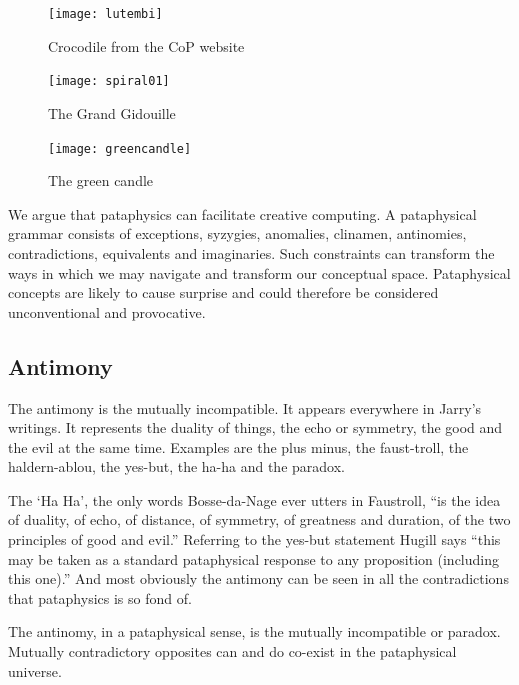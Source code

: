 \begin{figure}[htb]
  \centering
  \begin{minipage}{.275\linewidth}
    \texttt{[image: lutembi]}
  \caption[Crocodile]{Crocodile from the CoP website}
\label{img1}
  \end{minipage}
  \hspace{.05\linewidth}
  \begin{minipage}{.275\linewidth}
    \texttt{[image: spiral01]}
  \caption[Gidouille]{The Grand Gidouille}
\label{img2}
  \end{minipage}
  \hspace{.05\linewidth}
  \begin{minipage}{.275\linewidth}
    \texttt{[image: greencandle]}
  \caption[Green Candle]{The green candle}
\label{img3}
  \end{minipage}
\end{figure}

\begin{draft}
  We argue that pataphysics can facilitate creative computing. A pataphysical grammar consists of exceptions, syzygies, anomalies, clinamen, antinomies, contradictions, equivalents and imaginaries. Such constraints can transform the ways in which we may navigate and transform our conceptual space. Pataphysical concepts are likely to cause surprise and could therefore be considered unconventional and provocative.
\end{draft}


\subsection{Antimony}

The antimony is the mutually incompatible. It appears everywhere in Jarry's writings. It represents the duality of things, the echo or symmetry, the good and the evil at the same time. Examples are the plus minus, the faust-troll, the haldern-ablou, the yes-but, the ha-ha and the paradox.

The `Ha Ha', the only words Bosse-da-Nage ever utters in Faustroll, ``is the idea of duality, of echo, of distance, of symmetry, of greatness and duration, of the two principles of good and evil.'' \citep{Hugill2012} Referring to the yes-but statement Hugill says ``this may be taken as a standard pataphysical response to any proposition (including this one).'' And most obviously the antimony can be seen in all the contradictions that pataphysics is so fond of.

The antinomy, in a pataphysical sense, is the mutually incompatible or paradox. Mutually contradictory opposites can and do co-exist in the pataphysical universe.


